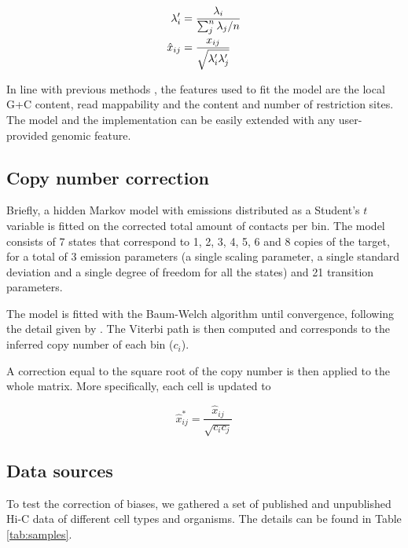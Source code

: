 \documentclass{bioinfo}
\begin{document}
\begin{methods}
\begin{align}
\notag
\lambda_i' &= \frac{\lambda_i}{\sum_j^n{\lambda_j}/n} \\
\label{eq:xhat}
\hat{x}_{ij} &= \frac{x_{ij}}{\sqrt{\lambda_i'\lambda_j'}}
\end{align}

In line with previous methods
\citep{yaffe2011probabilistic,hu2012hicnorm}, the features
used to fit the model are the local G+C content, read mappability and the 
content and number of restriction sites. The model and the implementation
can be easily extended with any user-provided genomic feature.

\subsection{Copy number correction}

Briefly, a hidden Markov model with emissions distributed as a Student's
$t$ variable is fitted on the corrected total amount of contacts per bin.
The model consists of 7 states that correspond to 1, 2, 3, 4, 5, 6 and 8
copies of the target, for a total of 3 emission parameters (a single
scaling parameter, a single standard deviation and a single degree of
freedom for all the states) and 21 transition parameters. 

The model is fitted with the Baum-Welch algorithm \citep{baum1966} until
convergence, following the detail given by \cite{filion2010systematic}.
The Viterbi path is then computed and corresponds to the inferred copy
number of each bin ($c_i$).

A correction equal to the square root of the copy number is then applied
to the whole matrix. More specifically, each cell is updated to


\begin{equation*}
\hat{x}_{ij}^* = \frac{\hat{x}_{ij}}{\sqrt{c_ic_j}}
\end{equation*}

\subsection{Data sources}

To test the correction of biases, we gathered a set of
published \citep{ledily2014distinct, encode2012integrated, rao20143d,
stadhouders2017transcription, lin2012global, dixon2012topological} and
unpublished Hi-C data of different cell types and organisms. The details
can be found in Table \ref{tab:samples}.


\end{methods}
\end{document}
